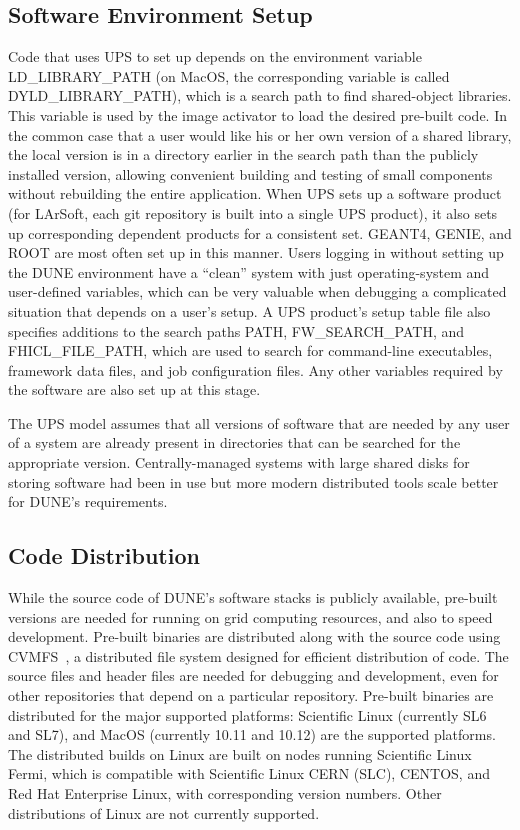 \subsection{Software Environment Setup}

Code that uses UPS to set up depends on the environment variable LD_LIBRARY_PATH (on MacOS, the corresponding
variable is called DYLD_LIBRARY_PATH), which is a search path to find shared-object libraries.  This
variable is used by the image activator to load the desired pre-built code.  In the common case that a user
would like his or her own version of a shared library, the local version is in a directory earlier in the
search path than the publicly installed version, allowing convenient building and testing of small components
without rebuilding the entire application.  When UPS sets up a software product (for LArSoft, each git repository
is built into a single UPS product), it also sets up corresponding dependent products for a consistent set.
GEANT4, GENIE, and ROOT are most often set up in this manner.  Users logging in without setting up the DUNE
environment have a ``clean'' system with just operating-system and user-defined variables, which can be very
valuable when debugging a complicated situation that depends on a user's setup.
A UPS product's setup table file also specifies additions to the search paths PATH, FW_SEARCH_PATH, and FHICL_FILE_PATH,
which are used to search for command-line executables, framework data files, and job configuration files.  Any
other variables required by the software are also set up at this stage.

The UPS model assumes that all versions of software that are needed by any user of a system are already present
in directories that can be searched for the appropriate version.  Centrally-managed systems with large
shared disks for storing software had been in use but more modern distributed tools scale better for DUNE's
requirements.

\subsection{Code Distribution}

While the source code of DUNE's software stacks is publicly available, pre-built versions are needed
for running on grid computing resources, and also to speed development.  Pre-built binaries are distributed
along with the source code using CVMFS~\cite{CVMFS}, a distributed file system designed for efficient
distribution of code.  The source files and header files are needed for debugging and development,
even for other repositories that depend on a particular repository.  Pre-built binaries are distributed
for the major supported platforms:  Scientific Linux (currently SL6 and SL7), and MacOS (currently 10.11
and 10.12) are the supported platforms.  The distributed builds on Linux are built on nodes running
Scientific Linux Fermi, which is compatible with Scientific Linux CERN (SLC), CENTOS, and Red Hat Enterprise
Linux, with corresponding version numbers.  Other distributions of Linux are not currently supported.

